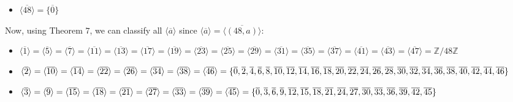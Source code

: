\begin{solution}
\begin{itemize}
        \item $\langle \overline{48}\rangle = \{\overline{0}\}$
    \end{itemize}

    Now, using Theorem $7$, we can classify all $\langle\overline{a}\rangle$
    since $\langle\overline{a}\rangle=\langle\overline{(48,a)}\rangle$:
    \begin{itemize}
        \item $\langle\overline{1}\rangle = \langle\overline{5}\rangle
        = \langle\overline{7}\rangle = \langle\overline{11}\rangle
        = \langle\overline{13}\rangle = \langle\overline{17}\rangle
        = \langle\overline{19}\rangle = \langle\overline{23}\rangle
        = \langle\overline{25}\rangle = \langle\overline{29}\rangle
        = \langle\overline{31}\rangle = \langle\overline{35}\rangle
        = \langle\overline{37}\rangle = \langle\overline{41}\rangle
        = \langle\overline{43}\rangle = \langle\overline{47}\rangle
        =  \mathbb{Z}/48\mathbb{Z}$

        \item $\langle\overline{2}\rangle = \langle\overline{10}\rangle
        = \langle\overline{14}\rangle = \langle\overline{22}\rangle
        = \langle\overline{26}\rangle = \langle\overline{34}\rangle
        = \langle\overline{38}\rangle = \langle\overline{46}\rangle
        = \{\overline{0}, \overline{2},
        \overline{4}, \overline{6}, \overline{8}, \overline{10},
        \overline{12}, \overline{14}, \overline{16},\\ \overline{18}, 
        \overline{20}, \overline{22}, \overline{24}, \overline{26},
        \overline{28}, \overline{30}, \overline{32}, \overline{34},
        \overline{36}, \overline{38}, \overline{40}, \overline{42},
        \overline{44}, \overline{46}\}$

        \item $\langle\overline{3}\rangle = \langle\overline{9}\rangle
        = \langle\overline{15}\rangle = \langle\overline{18}\rangle
        = \langle\overline{21}\rangle = \langle\overline{27}\rangle
        = \langle\overline{33}\rangle = \langle\overline{39}\rangle
        = \langle\overline{45}\rangle
        = \{\overline{0}, \overline{3},
        \overline{6}, \overline{9}, \overline{12}, \overline{15},
        \overline{18}, \\\overline{21}, \overline{24}, \overline{27},
        \overline{30}, \overline{33}, \overline{36}, \overline{39},
        \overline{42}, \overline{45}\}$


\end{itemize}
\end{solution}
